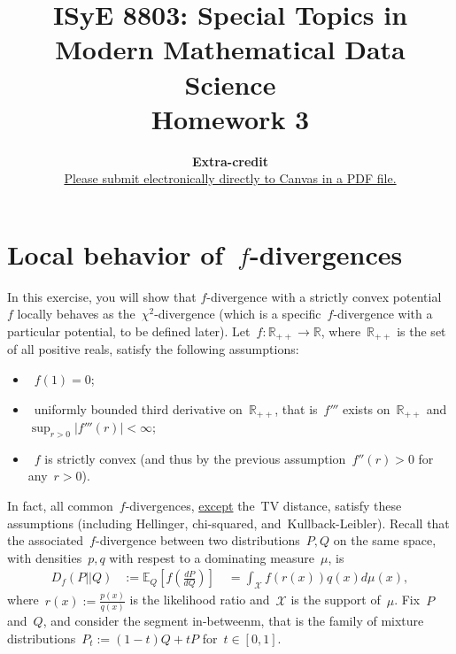 \documentclass[11pt]{article}
\title{ISyE 8803: Special Topics in Modern Mathematical Data Science\\ 
	   Homework 3}
\date{
\vspace{-0.3cm}
{\bf Extra-credit}\\
\vspace{0.3cm}
\underline{Please submit electronically directly to Canvas in a PDF file.}\\
}
\author{}
\newcommand{\proofstep}[1]{$\boldsymbol{{#1}^o}$}
\newcommand{\R}{\mathds{R}}
\newcommand{\E}{\mathds{E}}
\newcommand{\Cov}{\textup{Cov}}
\newcommand{\cX}{\mathcal{X}}
\newcommand{\bSigma}{\boldsymbol{\Sigma}}
\newcommand{\bId}{\boldsymbol{I}}
\begin{document}
\maketitle
\newcommand{\vsp}{\vspace{0.3cm}}

%


\newpage
\noindent 

\section{Local behavior of~$f$-divergences}
In this exercise, you will show that $f$-divergence with a {strictly convex} potential~$f$ locally behaves as the~$\chi^2$-divergence (which is a specific~$f$-divergence with a particular potential, to be defined later).
Let~$f: \R_{++} \to \R$, where~$\R_{++}$ is the set of all positive reals, satisfy the following assumptions:

\begin{itemize}
\item~$f(1) = 0$;
\item~uniformly bounded third derivative on~$\R_{++}$, that is~$f'''$ exists on~$\R_{++}$ and~$\sup_{r > 0} |f'''(r)| < \infty$; 
\item~$f$ is strictly convex (and thus by the previous assumption~$f''(r) > 0$ for any~$r > 0$).
\end{itemize}
In fact, all common~$f$-divergences, \underline{except} the~TV distance, satisfy these assumptions (including Hellinger, chi-squared, and~Kullback-Leibler).
Recall that the associated~$f$-divergence between two distributions~$P,Q$ on the same space, with densities~$p,q$ with respest to a dominating measure~$\mu$, is
\[
\begin{aligned}
D_f(P||Q) 
&:= \E_{Q} \left[ f\left( \frac{d P}{d Q} \right) \right] 
\quad = \int_{\cX} f\left( r(x) \right) q(x) d \mu(x),
\end{aligned}
\]
where~$r(x) := \frac{p(x)}{q(x)}$ is the likelihood ratio and~$\cX$ is the support of~$\mu$.
Fix~$P$ and~$Q$, and consider the segment in-betweenm, that is the family of mixture distributions~$P_t := (1-t)Q + tP$ for~$t \in [0,1]$. 
\end{document}
